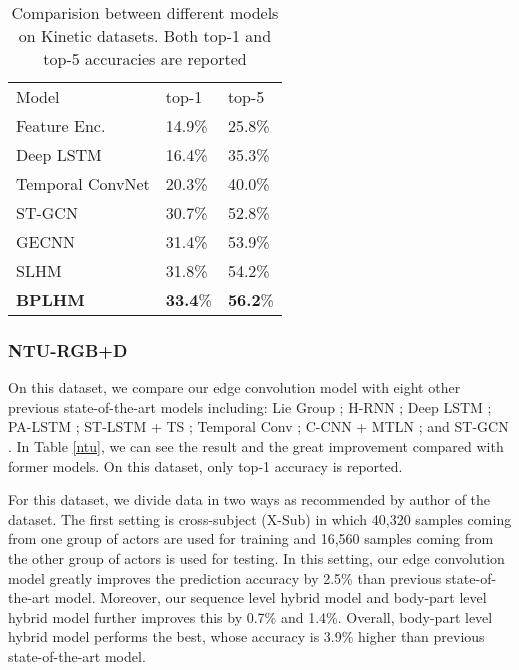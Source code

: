 \documentclass[a4paper,11pt]{article}
\begin{document}
\begin{table}
\begin{center}
\caption{Comparision between different models on Kinetic datasets. Both top-1 and top-5 accuracies are reported}
\label{kinetics}
\begin{tabular}{lll}
\hline\noalign{\smallskip}
Model & top-1 & top-5\\
\noalign{\smallskip}
\hline
\noalign{\smallskip}
Feature Enc. \cite{fernando2015modeling}  & 14.9\% & 25.8\% \\
Deep LSTM \cite{shahroudy2016ntu} & 16.4\% & 35.3\% \\
Temporal ConvNet \cite{soo2017interpretable} \quad \quad \quad \quad & 20.3\% & 40.0\%\\
ST-GCN \cite{yan2018spatial} & 30.7\% & 52.8\%
\\
\hline{GECNN} & 31.4\% & 53.9\% \\
{SLHM} & {31.8}\% & {54.2}\% \\
{\bf BPLHM} & {\bf 33.4}\% & {\bf 56.2}\% \\       %
\hline
\end{tabular}
\end{center}
\end{table}


\subsubsection{NTU-RGB+D}
On this dataset, we compare our edge convolution model with eight other previous state-of-the-art models including: Lie Group \cite{vemulapalli2014human}; H-RNN \cite{du2015hierarchical}; Deep LSTM \cite{shahroudy2016ntu}; PA-LSTM \cite{shahroudy2016ntu}; ST-LSTM + TS \cite{liu2016spatio}; Temporal Conv \cite{soo2017interpretable}; C-CNN + MTLN \cite{ke2017new}; and ST-GCN \cite{yan2018spatial}. In Table \ref{ntu}, we can see the result and the great improvement compared with former models. On this dataset, only top-1 accuracy is reported.

For this dataset, we divide data in two ways as recommended by author of the dataset. The first setting is cross-subject (X-Sub) in which 40,320 samples coming from one group of actors are used for training and 16,560 samples coming from the other group of actors is used for testing. In this setting, our edge convolution model greatly improves the prediction accuracy by 2.5\% than previous state-of-the-art model. Moreover, our sequence level hybrid model and body-part level hybrid model further improves this by 0.7\% and 1.4\%. Overall, body-part level hybrid model performs the best, whose accuracy is 3.9\% higher than previous state-of-the-art model.
\end{document}
